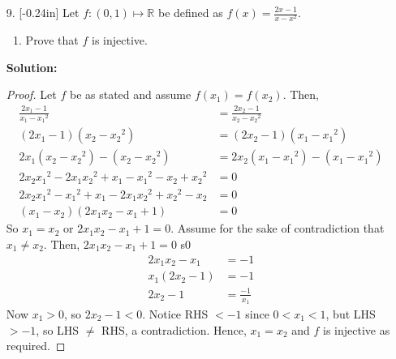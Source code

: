 \documentclass[letterpaper,12pt]{article}
\theoremstyle{definition}
\begin{document}
\pagebreak
\begin{enumerate}
    \item[9.] \reversemarginpar{}[-0.24in] 
    Let $f:(0,1) \mapsto \mathbb{R}$ be defined as $f(x) = \frac{2x-1}{x-x^2}$. \begin{enumerate}
        \item Prove that $f$ is injective.
    \end{enumerate}
    \begin{mdframed}
            \textbf{Solution:}
            \begin{proof}
              Let $f$ be as stated and assume $f(x_1) = f(x_2)$. Then, \begin{align*}
                  \frac{2x_1-1}{x_1-{x_1}^2} &= \frac{2x_2-1}{x_2-{x_2}^2} \\
                  (2x_1-1)(x_2-{x_2}^2) &= (2x_2-1)(x_1-{x_1}^2) \\
                  2x_1(x_2-{x_2}^2) - (x_2-{x_2}^2) &= 2x_2(x_1-{x_1}^2) - (x_1-{x_1}^2) \\
                  2x_2{x_1}^2 - 2x_1{x_2}^2 + x_1-{x_1}^2 - x_2+{x_2}^2 &= 0 \\
                  2x_2{x_1}^2 -{x_1}^2  + x_1 - 2x_1{x_2}^2 +{x_2}^2  - x_2 &= 0 \\
                  (x_1 - x_2)(2x_1x_2 - x_1 + 1) &= 0
              \end{align*}
              So $x_1 = x_2$ or $2x_1x_2 - x_1 + 1 = 0$. Assume for the sake of contradiction that $x_1 \neq x_2$. Then, $2x_1x_2 - x_1 + 1 = 0$ s0 \begin{align*}
                  2x_1x_2 - x_1 &= -1 \\
                  x_1(2x_2 - 1) &= -1 \\
                  2x_2 - 1 &= \frac{-1}{x_1}
              \end{align*}
              Now $x_1 >0$, so $2x_2 - 1 < 0$. Notice RHS $< -1$ since $0 < x_1 < 1$, but LHS $> -1$, so LHS $\neq$ RHS, a contradiction. Hence, $x_1 = x_2$ and $f$ is injective as required.
            \end{proof}
        \end{mdframed}
\end{enumerate}
\pagebreak
\end{document}
